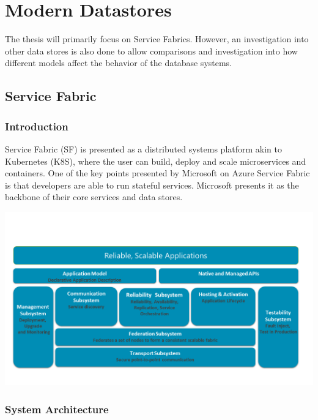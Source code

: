 \documentclass[a4paper,10pt,titlepage]{report}
\begin{document}
    \newpage


    \chapter{Modern Datastores}

    The thesis will primarily focus on Service Fabrics. However, an investigation into other data stores is also done to allow comparisons and investigation into how different models affect the behavior of the database systems.


    \section{Service Fabric}

    \subsection{Introduction}

    Service Fabric (SF) is presented as a distributed systems platform akin to Kubernetes (K8S), where the user can build, deploy and scale microservices and containers. One of the key points presented by Microsoft on Azure Service Fabric is that developers are able to run stateful services. Microsoft presents it as the backbone of their core services and data stores.\\
    \vspace{5mm}

    \includegraphics[scale=0.5]{images/service-fabric-architecture.png}

    \subsection{System Architecture}
\end{document}
